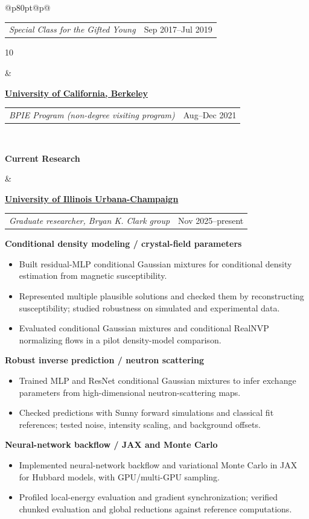 \documentclass[11pt,letterpaper]{article}
\makeatletter
\newcommand{\datedline}[2]{%
  \begin{tabularx}{\linewidth}{@{}>{\raggedright\arraybackslash}Xr@{}}#1&{\small\sffamily\color{quietgray}#2}\end{tabularx}\par\nobreak}
\newcommand{\entry}[3]{%
  #1\par\nobreak
  \datedline{\textit{#2}}{#3}}
\newcommand{\cvrow}[3]{%
  {\raggedright\small\sffamily\bfseries\color{sectiontone}#1\par}&%
  \begin{minipage}[t]{\linewidth}\raggedright #2\end{minipage}\\\noalign{\vskip #3pt}}
\makeatother
\begin{document}
\begin{longtable}{@{}p{80pt}@{\hspace{14pt}}p{\dimexpr\textwidth-94pt\relax}@{}}
{\datedline{\textit{Special Class for the Gifted Young}}{Sep 2017--Jul 2019}
}{10}
\cvrow{}{\href{https://www.berkeley.edu/}{\textcolor{accent}{\textbf{University of California, Berkeley}}}\par
\datedline{\textit{BPIE Program (non-degree visiting program)}}{Aug--Dec 2021}
}{18}
\cvrow{Current Research}{\entry{\href{https://illinois.edu/}{\textcolor{accent}{\textbf{University of Illinois Urbana-Champaign}}}}{Graduate researcher, Bryan K. Clark group}{Nov 2025--present}
\vspace{8pt}
\textbf{Conditional density modeling / crystal-field parameters}\par
\begin{itemize}
  \item Built residual-MLP conditional Gaussian mixtures for conditional density estimation from magnetic susceptibility.
  \item Represented multiple plausible solutions and checked them by reconstructing susceptibility; studied robustness on simulated and experimental data.
  \item Evaluated conditional Gaussian mixtures and conditional RealNVP normalizing flows in a pilot density-model comparison.
\end{itemize}
\vspace{8pt}
\textbf{Robust inverse prediction / neutron scattering}\par
\begin{itemize}
  \item Trained MLP and ResNet conditional Gaussian mixtures to infer exchange parameters from high-dimensional neutron-scattering maps.
  \item Checked predictions with Sunny forward simulations and classical fit references; tested noise, intensity scaling, and background offsets.
\end{itemize}
\vspace{8pt}
\textbf{Neural-network backflow / JAX and Monte Carlo}\par
\begin{itemize}
  \item Implemented neural-network backflow and variational Monte Carlo in JAX for Hubbard models, with GPU/multi-GPU sampling.
  \item Profiled local-energy evaluation and gradient synchronization; verified chunked evaluation and global reductions against reference computations.
\end{itemize}}{18}
\end{longtable}
\end{document}
